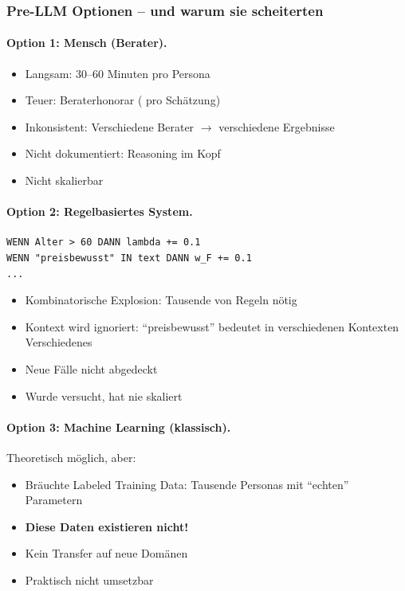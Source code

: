 \subsubsection{Pre-LLM Optionen -- und warum sie scheiterten}

\paragraph{Option 1: Mensch (Berater).}
\begin{itemize}
    \item[$-$] Langsam: 30--60 Minuten pro Persona
    \item[$-$] Teuer: Beraterhonorar ( pro Schätzung)
    \item[$-$] Inkonsistent: Verschiedene Berater $\rightarrow$ verschiedene Ergebnisse
    \item[$-$] Nicht dokumentiert: Reasoning im Kopf
    \item[$-$] Nicht skalierbar
\end{itemize}

\paragraph{Option 2: Regelbasiertes System.}
\begin{verbatim}
WENN Alter > 60 DANN lambda += 0.1
WENN "preisbewusst" IN text DANN w_F += 0.1
...
\end{verbatim}

\begin{itemize}
    \item[$-$] Kombinatorische Explosion: Tausende von Regeln nötig
    \item[$-$] Kontext wird ignoriert: ``preisbewusst'' bedeutet in verschiedenen Kontexten Verschiedenes
    \item[$-$] Neue Fälle nicht abgedeckt
    \item[$-$] Wurde versucht, hat nie skaliert
\end{itemize}

\paragraph{Option 3: Machine Learning (klassisch).}
Theoretisch möglich, aber:
\begin{itemize}
    \item[$-$] Bräuchte Labeled Training Data: Tausende Personas mit ``echten'' Parametern
    \item[$-$] \textbf{Diese Daten existieren nicht!}
    \item[$-$] Kein Transfer auf neue Domänen
    \item[$-$] Praktisch nicht umsetzbar
\end{itemize}

